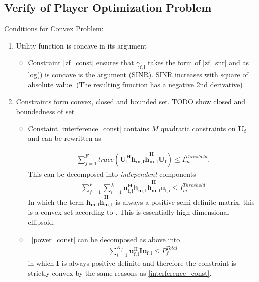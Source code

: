\documentclass[12pt]{article}
\begin{document}
\subsection{Verify of Player Optimization Problem}

Conditions for Convex Problem:

\begin{enumerate}
\item Utility function is concave in its argument 
\begin{itemize}
\item 
Constraint \eqref{zf_const}  ensures that $\gamma_{\mathrm{f,i}}$ takes the form of \eqref{zf_snr} and  as log() is concave is the argument (SINR). SINR increases with square of absolute value. (The resulting function has a negative 2nd derivative)
\end{itemize}

\item
Constraints form convex, closed and bounded set. TODO show closed and boundedness of set

\begin{itemize}

\item
	Constaint \eqref{interference_const} contains $M$ quadratic constraints on $\mathbf{U_f}$ and 
	can be rewritten as 

\begin{gather*}
	\sum_{f=1}^F
	trace(\mathbf{U_f^H} \mathbf{\tilde{h}_{m,f}} \mathbf{\tilde{h}_{m,f}^H} \mathbf{U_f} )\leq 
	I^{Threshold}_{m}.
\end{gather*}
This can be decomposed into \textit{independent} components 
	\begin{gather*}
	\sum_{f=1}^F
	\sum_{i=1}^{f_i}
	\mathbf{u_{\mathrm{f,i}}^H} \mathbf{\tilde{h}_{m,f}} \mathbf{\tilde{h}_{m,f}^H} 
	\mathbf{u_{\mathrm{f,i}}} \leq I^{Threshold}_{m}
	\end{gather*}
In which the term $ \mathbf{\tilde{h}_{m,f}} \mathbf{\tilde{h}_{m,f}^H}$ is always a positive semi-definite matrix, this is a convex set according to 
\cite[p.8,9]{BoV:04}. This is essentially high dimensional ellipsoid.



\item \
	\eqref{power_const} can be decomposed as above into
	\begin{gather*}
		\sum_{i=1}^{K_f}\mathbf{u_{\mathrm{f,i}}^{\mathrm{H}}} \mathbf{I} 		
		\mathbf{u_{\mathrm{f,i}}} \leq  P^{Total}_{f}
	\end{gather*}
	in which $\mathbf{I}$ is always positive definite and 			
	therefore the constraint is strictly convex by the same 		
	reasons as \eqref{interference_const}.
\end{itemize}


\end{enumerate}
\end{document}
